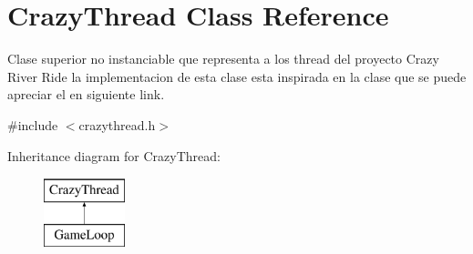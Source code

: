 \hypertarget{class_crazy_thread}{\section{Crazy\-Thread Class Reference}
\label{class_crazy_thread}
}


Clase superior no instanciable que representa a los thread del proyecto Crazy River Ride la implementacion de esta clase esta inspirada en la clase que se puede apreciar el en siguiente link.  




{\ttfamily \#include $<$crazythread.\-h$>$}

Inheritance diagram for Crazy\-Thread\-:\begin{figure}[H]
\begin{center}
\leavevmode
\includegraphics[height=2.000000cm]{class_crazy_thread}
\end{center}
\end{figure}
